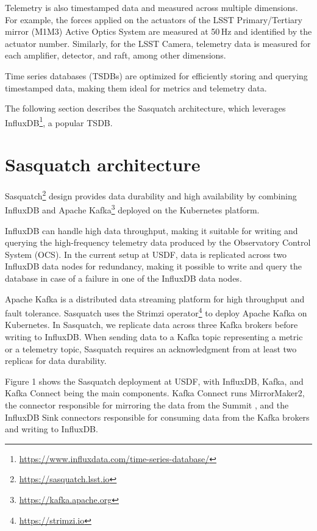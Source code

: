 Telemetry is also timestamped data and measured across multiple dimensions. For example, the forces applied on the actuators of the LSST Primary/Tertiary mirror (M1M3) Active Optics System are measured at 50\,Hz and identified by the actuator number. Similarly, for the LSST Camera, telemetry data is measured for each amplifier, detector, and raft, among other dimensions.

Time series databases (TSDBs) are optimized for efficiently storing and querying timestamped data, making them ideal for metrics and telemetry data.

The following section describes the Sasquatch architecture, which leverages InfluxDB\footnote{\url{https://www.influxdata.com/time-series-database/}}, a popular TSDB.

\section{Sasquatch architecture}
\label{sec:arch}

Sasquatch\footnote{\url{https://sasquatch.lsst.io}} design provides data durability and high availability by combining InfluxDB and Apache Kafka\footnote{\url{https://kafka.apache.org}} deployed on the Kubernetes platform. \cite{SQR-029,SQR-068}

InfluxDB can handle high data throughput, making it suitable for writing and querying the high-frequency telemetry data produced by the Observatory Control System (OCS). In the current setup at USDF, data is replicated across two InfluxDB data nodes for redundancy, making it possible to write and query the database in case of a failure in one of the InfluxDB data nodes.

Apache Kafka is a distributed data streaming platform for high throughput and fault tolerance. Sasquatch uses the Strimzi operator\footnote{\url{https://strimzi.io}} to deploy Apache Kafka on Kubernetes. In Sasquatch, we replicate data across three Kafka brokers before writing to InfluxDB. When sending data to a Kafka topic representing a metric or a telemetry topic, Sasquatch requires an acknowledgment from at least two replicas for data durability.

Figure 1 shows the Sasquatch deployment at USDF, with InfluxDB, Kafka, and Kafka Connect being the main components. Kafka Connect runs MirrorMaker2, the connector responsible for mirroring the data from the Summit \cite{SQR-050}, and the InfluxDB Sink connectors responsible for consuming data from the Kafka brokers and writing to InfluxDB.

